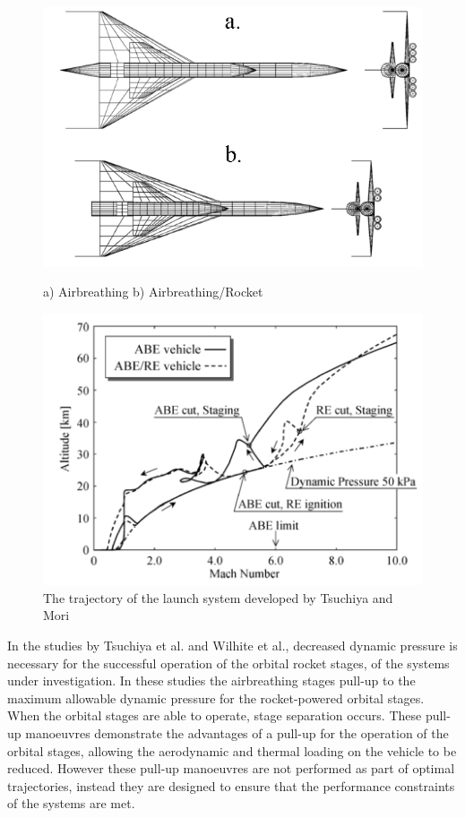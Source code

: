\begin{figure}
	\centering
	\begin{minipage}[b]{0.45\textwidth}
		\centering
		\includegraphics[width=\linewidth]{"figures/2_literature-review/Tsuchiya Vehicles"}
		\caption{a) Airbreathing b) Airbreathing/Rocket}
		\label{fig:TsuchiyaVehicle}
	\end{minipage}	
	\begin{minipage}[b]{0.45\textwidth}
		\includegraphics[width=\linewidth]{"figures/2_literature-review/Tsuchiya"}
		\caption{The trajectory of the launch system developed by Tsuchiya and Mori \cite{Tsuchiya2005}}
		\label{fig:TsuchiyaTrajectory}
	\end{minipage}
\end{figure}


In the studies by Tsuchiya et al.\cite{Tsuchiya2005} and Wilhite et al.\cite{Wilhite1991}, decreased dynamic pressure is necessary for the successful operation of the orbital rocket stages, of the systems under investigation. In these studies the airbreathing stages pull-up to the maximum allowable dynamic pressure for the rocket-powered orbital stages. When the orbital stages are able to operate, stage separation occurs. These pull-up manoeuvres demonstrate the advantages of a pull-up for the operation of the orbital stages, allowing the aerodynamic and thermal loading on the vehicle to be reduced. However these pull-up manoeuvres are not performed as part of optimal trajectories, instead they are designed to ensure that the performance constraints of the systems are met. 

